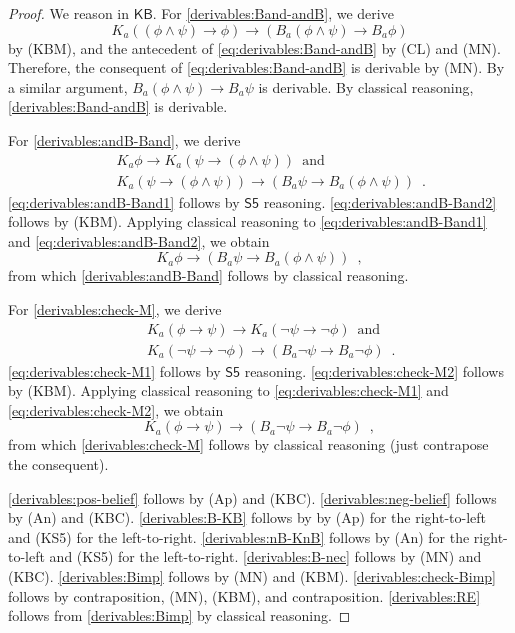 \documentclass[12pt]{article}
\theoremstyle{definition}
\newcommand{\KB}{{\mathsf{KB}}}                        %
\begin{document}
\begin{proof}
  We reason in $\KB$.
  For \ref{derivables:Band-andB}, we derive
  \begin{equation}
    K_a((\phi\land\psi)\to\phi)\to(B_a(\phi\land\psi)\to B_a\phi)
    \label{eq:derivables:Band-andB}
  \end{equation}
  by (KBM), and the antecedent of \eqref{eq:derivables:Band-andB} by (CL) and (MN).
  Therefore, the consequent of \eqref{eq:derivables:Band-andB} is derivable by (MN).
  By a similar argument,  $B_a(\phi\land\psi)\to B_a\psi$ is derivable.  By classical
  reasoning,
  \ref{derivables:Band-andB} is derivable.
  
  For \ref{derivables:andB-Band}, we derive
  \begin{eqnarray}
    &&
    K_a\phi\to K_a(\psi\to(\phi\land\psi)) \enspace\text{and}
    \label{eq:derivables:andB-Band1}
    \\
    &&
    K_a(\psi\to(\phi\land\psi))\to(B_a\psi\to B_a(\phi\land\psi)) \enspace\text{.}
    \label{eq:derivables:andB-Band2}
  \end{eqnarray}
  \eqref{eq:derivables:andB-Band1} follows by $\mathsf{S5}$ reasoning.
  \eqref{eq:derivables:andB-Band2} follows by (KBM).  Applying classical reasoning
  to \eqref{eq:derivables:andB-Band1} and \eqref{eq:derivables:andB-Band2},
  we obtain
  \[
  K_a\phi\to (B_a\psi\to B_a(\phi\land\psi))\enspace,
  \]
  from which \ref{derivables:andB-Band} follows by classical reasoning.

  For \ref{derivables:check-M}, we derive
  \begin{eqnarray}
    &&
    K_a(\phi\to\psi)\to K_a(\lnot\psi\to\lnot\phi) \enspace\text{and}
    \label{eq:derivables:check-M1}
    \\
    &&
    K_a(\lnot\psi\to\lnot\phi)\to(B_a\lnot\psi\to B_a\lnot\phi) \enspace\text{.}
    \label{eq:derivables:check-M2}
  \end{eqnarray}
  \eqref{eq:derivables:check-M1} follows by $\mathsf{S5}$ reasoning.
  \eqref{eq:derivables:check-M2} follows by (KBM).  Applying classical reasoning
  to \eqref{eq:derivables:check-M1} and \eqref{eq:derivables:check-M2},
  we obtain
  \[
  K_a(\phi\to\psi)\to(B_a\lnot\psi\to B_a\lnot\phi)\enspace,
  \]
  from which \ref{derivables:check-M} follows by classical reasoning
  (just contrapose the consequent).

  \ref{derivables:pos-belief} follows by (Ap) and (KBC).
  \ref{derivables:neg-belief} follows by (An) and (KBC).
  \ref{derivables:B-KB} follows by by (Ap) for the right-to-left and (KS5) for the left-to-right.
  \ref{derivables:nB-KnB} follows by (An) for the right-to-left and (KS5) for the left-to-right.
  \ref{derivables:B-nec} follows by (MN) and (KBC).
  \ref{derivables:Bimp} follows by (MN) and (KBM).
  \ref{derivables:check-Bimp} follows by contraposition, (MN), (KBM), and contraposition.
  \ref{derivables:RE} follows from \ref{derivables:Bimp} by classical reasoning.


\end{proof}
\end{document}
